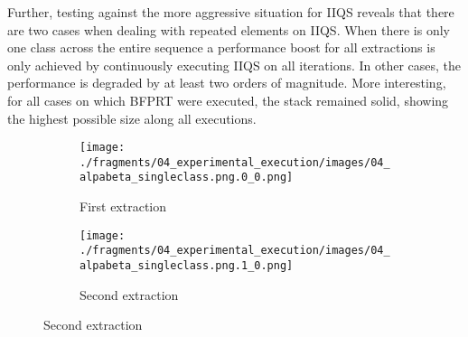 Further, testing against the more aggressive situation for IIQS reveals that there are two cases when dealing with repeated elements on IIQS. When there is only one class across the entire sequence a performance boost for all extractions is only achieved by continuously executing IIQS on all iterations. In other cases, the performance is degraded by at least two orders of magnitude. More interesting, for all cases on which BFPRT were executed, the stack remained solid, showing the highest possible size along all executions.\\



\begin{figure}
    \centering
    \begin{subfigure}[b]{0.45\textwidth}
        \centering
        \texttt{[image: ./fragments/04\_experimental\_execution/images/04\_alpabeta\_singleclass.png.0\_0.png]}
        \caption{First extraction}
        \label{FIG:05_ALPHABETA_RELATIONSHIP_SINGLECLASS__0_0}
    \end{subfigure}
    \begin{subfigure}[b]{0.45\textwidth}
        \centering
        \texttt{[image: ./fragments/04\_experimental\_execution/images/04\_alpabeta\_singleclass.png.1\_0.png]}
        \caption{Second extraction}
        \label{FIG:05_ALPHABETA_RELATIONSHIP_SINGLECLASS__0_1}
    \end{subfigure}




\end{figure}
